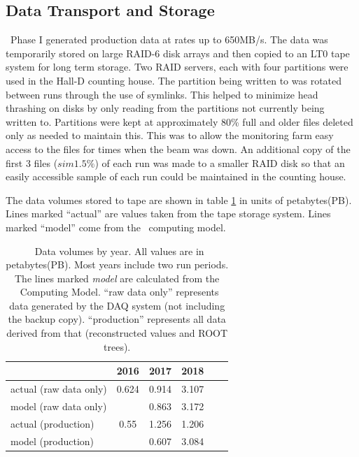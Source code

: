 \subsection{Data Transport and Storage \label{sec:onlineprocessing}}

\GX ~Phase I generated production data at rates up to 650MB/s. The data was temporarily stored on large RAID-6 disk arrays and then copied to an LT0 tape system for long term storage. Two RAID servers, each with four partitions were used in the Hall-D counting house. The partition being written to was rotated between runs through the use of symlinks. This helped to minimize head thrashing on disks by only reading from the partitions not currently being written to. Partitions were kept at approximately 80\% full and older files deleted only as needed to maintain this. This was to allow the monitoring farm easy access to the files for times when the beam was down. An additional copy of the first 3 files ($sim1.5\%$) of each run was made to a smaller RAID disk so that an easily accessible sample of each run could be maintained in the counting house.

The data volumes stored to tape are shown in table \ref{tab:online_data_volumes} in units of petabytes(PB). Lines marked ``actual'' are values taken from the tape storage system. Lines marked ``model'' come from the \GX ~computing model\cite{gx3821}.

\begin{table}[]
    \centering
    \begin{tabular}{|l|c|c|c|c|c|}
    \hline
                           & \textbf{2016}  & \textbf{2017}  & \textbf{2018} \\
    \hline
    actual (raw data only) & 0.624 & 0.914 & 3.107 \\
    \hline
     model (raw data only) &       & 0.863 & 3.172 \\
    \hline
    \hline
    actual (production)    & 0.55  & 1.256 & 1.206 \\
    \hline
     model (production)    &       & 0.607 & 3.084 \\
    \hline
    \end{tabular}
    \caption{\GX ~Data volumes by year. All values are in petabytes(PB). Most years include two run periods. The lines marked \textit{model} are calculated from the \GX ~Computing Model\cite{gx3821}. ``raw data only'' represents data generated by the DAQ system (not including the backup copy). ``production'' represents all data derived from that (reconstructed values and ROOT trees). }
    \label{tab:online_data_volumes}
\end{table}

